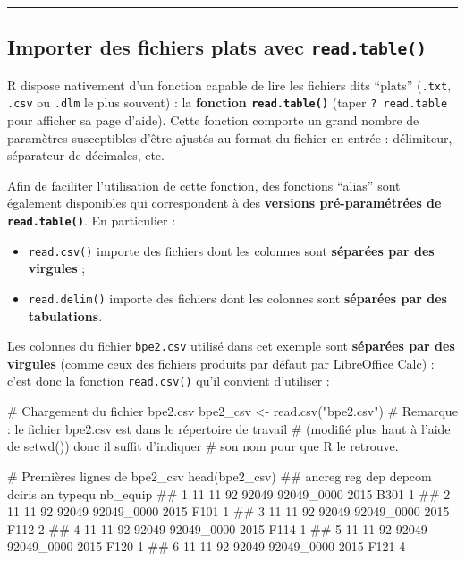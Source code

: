 \documentclass[12pt,twosided, notitlepage]{book}
\newenvironment{Shaded}{}{}
\newcommand{\KeywordTok}[1]{\textcolor[rgb]{0.00,0.00,1.00}{#1}}
\newcommand{\StringTok}[1]{\textcolor[rgb]{0.00,0.50,0.50}{#1}}
\newcommand{\CommentTok}[1]{\textcolor[rgb]{0.00,0.50,0.00}{#1}}
\newcommand{\NormalTok}[1]{#1}
\providecommand{\tightlist}{%
  \setlength{\itemsep}{0pt}\setlength{\parskip}{0pt}}
\renewenvironment{Shaded}{\begin{snugshade}}{\end{snugshade}}
\begin{document}
\begin{center}\rule{0.5\linewidth}{\linethickness}\end{center}

\subsection{\texorpdfstring{Importer des fichiers plats avec
\texttt{read.table()}}{Importer des fichiers plats avec read.table()}}\label{importer-des-fichiers-plats-avec-read.table}

R dispose nativement d'un fonction capable de lire les fichiers dits
\enquote{plats} (\texttt{.txt}, \texttt{.csv} ou \texttt{.dlm} le plus
souvent) : la \textbf{fonction
\texttt{read.table()}} (taper
\texttt{?\ read.table} pour afficher sa page d'aide). Cette fonction
comporte un grand nombre de paramètres susceptibles d'être ajustés au
format du fichier en entrée : délimiteur, séparateur de décimales, etc.

Afin de faciliter l'utilisation de cette fonction, des fonctions
\enquote{alias} sont également disponibles qui correspondent à des
\textbf{versions pré-paramétrées de \texttt{read.table()}}. En
particulier :

\begin{itemize}
\tightlist
\item
  \texttt{read.csv()} importe des
  fichiers dont les colonnes sont \textbf{séparées par des virgules} ;
\item
  \texttt{read.delim()} importe des
  fichiers dont les colonnes sont \textbf{séparées par des tabulations}.
\end{itemize}

Les colonnes du fichier \texttt{bpe2.csv} utilisé dans cet exemple sont
\textbf{séparées par des virgules} (comme ceux des fichiers produits par
défaut par LibreOffice Calc) : c'est donc la fonction
\texttt{read.csv()} qu'il convient d'utiliser :

\begin{Shaded}
\begin{Highlighting}[]
\CommentTok{# Chargement du fichier bpe2.csv}
\NormalTok{bpe2_csv <-}\StringTok{ }\KeywordTok{read.csv}\NormalTok{(}\StringTok{"bpe2.csv"}\NormalTok{)}
\CommentTok{# Remarque : le fichier bpe2.csv est dans le répertoire de travail}
\CommentTok{# (modifié plus haut à l'aide de setwd()) donc il suffit d'indiquer }
\CommentTok{# son nom pour que R le retrouve. }

\CommentTok{# Premières lignes de bpe2_csv}
\KeywordTok{head}\NormalTok{(bpe2_csv)}
\NormalTok{  ##   ancreg reg dep depcom     dciris   an typequ nb_equip}
\NormalTok{  ## 1     11  11  92  92049 92049_0000 2015   B301        1}
\NormalTok{  ## 2     11  11  92  92049 92049_0000 2015   F101        1}
\NormalTok{  ## 3     11  11  92  92049 92049_0000 2015   F112        2}
\NormalTok{  ## 4     11  11  92  92049 92049_0000 2015   F114        1}
\NormalTok{  ## 5     11  11  92  92049 92049_0000 2015   F120        1}
\NormalTok{  ## 6     11  11  92  92049 92049_0000 2015   F121        4}
\end{Highlighting}
\end{Shaded}
\end{document}
